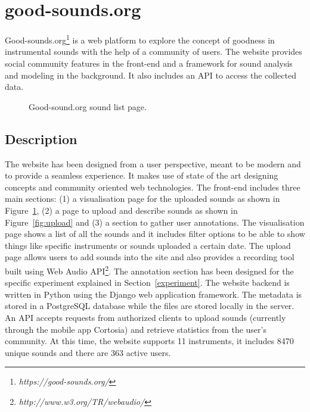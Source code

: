 \documentclass{article}
\begin{document}
\section{good-sounds.org}\label{sec:goodsounds}
Good-sounds.org\footnote{\textit{https://good-sounds.org/}} is a web platform to explore the concept of goodness in instrumental sounds with the help of a community of users. The website provides social community features in the front-end and a framework for sound analysis and modeling in the background. It also includes an API to access the collected data.

\begin{figure}[ht]
 \centerline{}
 \caption{Good-sound.org sound list page.}
 \label{fig:sound_list}
\end{figure}

\subsection{Description} 
The website has been designed from a user perspective, meant to be modern and to provide a seamless experience. It makes use of state of the art designing concepts and community oriented web technologies. The front-end includes three main sections: (1) a visualisation page for the uploaded sounds as shown in Figure~\ref{fig:sound_list}, (2) a page to  upload and describe sounds as shown in Figure~\ref{fig:upload} and (3) a section to gather user annotations. The visualisation page shows a list of all the sounds and it includes filter options to be able to show things like specific instruments or sounds uploaded a certain date. The upload page allows users to add sounds into the site and also provides a recording tool built using Web Audio API\footnote{\textit{http://www.w3.org/TR/webaudio/}}. The annotation section has been designed for the specific experiment explained in Section~\ref{experiment}. 
The website backend is written in Python using the Django web application framework. The metadata is stored in a PostgreSQL database while the files are stored locally in the server. An API accepts requests from authorized clients to upload sounds (currently through the mobile app Cortosia) and retrieve statistics from the user’s community. 
At this time, the website supports 11 instruments, it includes 8470 unique sounds and there are 363 active users. 
\end{document}
